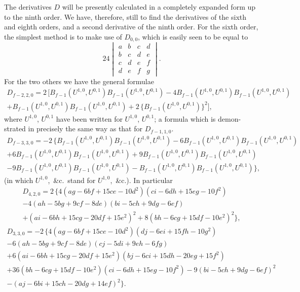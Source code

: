 \documentclass[11pt,a4paper]{book}
\begin{document}
The derivatives $D$ will be presently calculated in a completely expanded form up to
the ninth order. We have, therefore, still to find the derivatives of the sixth and
eighth orders, and a second derivative of the ninth order. For the sixth order, the
simplest method is to make use of $D_{0,0}$, which is easily seen to be equal to
\[
24\begin{vmatrix}
a & b & c & d \\
b & c & d & e \\
c & d & e & f \\
d & e & f & g
\end{vmatrix}.
\]
For the two others we have the general formulae
\begin{multline*}
D_{f-2,2,0} = 2\,[B_{f-1}(U^{1,0}, U^{0,1}) B_{f-1}(U^{1,0}, U^{0,1})
- 4B_{f-1}(U^{1,0}, U^{0,1}) B_{f-1}(U^{1,0}, U^{0,1})\\
+ B_{f-1}(U^{1,0}, U^{0,1}) B_{f-1}(U^{1,0}, U^{0,1})
+ 2\,\{B_{f-1}(U^{1,0}, U^{0,1})\}^2],
\end{multline*}
where $U^{1,0}$, $U^{0,1}$ have been written for $U^{1,0}$, $U^{0,1}$; a formula which is demon-
strated in precisely the same way as that for $D_{f-1,1,0}$.
\begin{multline*}
D_{f-3,3,0} = -2\,\{B_{f-1}(U^{1,0}, U^{0,1}) B_{f-1}(U^{1,0}, U^{0,1})
- 6B_{f-1}(U^{1,0}, U^{0,1}) B_{f-1}(U^{1,0}, U^{0,1})\\
+ 6B_{f-1}(U^{1,0}, U^{0,1}) B_{f-1}(U^{1,0}, U^{0,1})
+ 9B_{f-1}(U^{1,0}, U^{0,1}) B_{f-1}(U^{1,0}, U^{0,1})\\
- 9B_{f-1}(U^{1,0}, U^{0,1}) B_{f-1}(U^{1,0}, U^{0,1})
- B_{f-1}(U^{1,0}, U^{0,1}) B_{f-1}(U^{1,0}, U^{0,1})\},
\end{multline*}
(in which $U^{1,0}$,\ \&c.\ stand for $U^{1,0}$,\ \&c.). In particular
\begin{multline*}
D_{4,2,0} = 2\,\{4(ag - 6bf + 15ce - 10d^2)(ci - 6dh + 15eg - 10f^2)\\
- 4(ah - 5bg + 9cf - 8de)(bi - 5ch + 9dg - 6ef)\\
+ (ai - 6bh + 15cg - 20df + 15e^2)^2
+ 8(bh - 6cg + 15df - 10e^2)^2\},
\end{multline*}
\begin{multline*}
D_{3,3,0} = -2\,\{4(ag - 6bf + 15ce - 10d^2)(dj - 6ei + 15fh - 10g^2)\\
- 6(ah - 5bg + 9cf - 8de)(cj - 5di + 9eh - 6fg)\\
+ 6(ai - 6bh + 15cg - 20df + 15e^2)(bj - 6ci + 15dh - 20eg + 15f^2)\\
+ 36(bh - 6cg + 15df - 10e^2)(ci - 6dh + 15eg - 10f^2)
- 9(bi - 5ch + 9dg - 6ef)^2\\
- (aj - 6bi + 15ch - 20dg + 14ef)^2\}.
\end{multline*}
\end{document}
